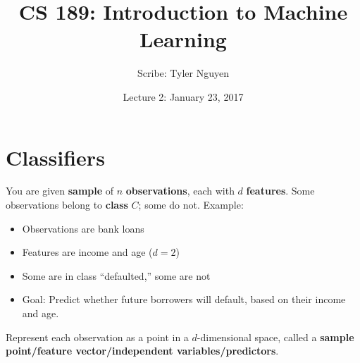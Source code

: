 \documentclass{article}
\begin{document}
\title{CS 189: Introduction to Machine Learning}
\author{Scribe: Tyler Nguyen}
\date{Lecture 2: January 23, 2017}
\maketitle
\section{Classifiers}
You are given \textbf{sample} of \(n\) \textbf{observations}, each with \(d\) \textbf{features}.  Some observations belong to \textbf{class} \(C\); some do not.  Example:
\begin{itemize}
\item Observations are bank loans
\item Features are income and age (\(d=2\))
\item Some are in class ``defaulted,'' some are not
\item Goal: Predict whether future borrowers will default, based on their income and age.
\end{itemize}
Represent each observation as a point in a \(d\)-dimensional space, called a \textbf{sample point/feature vector/independent variables/predictors}.
\end{document}
